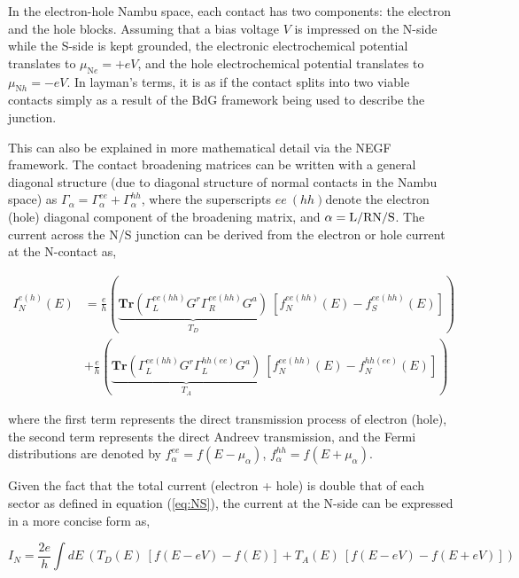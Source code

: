 In the electron-hole Nambu space, each contact has two components: the electron and the hole blocks. Assuming that a bias voltage $V$ is impressed on the N-side while the S-side is kept grounded, the electronic electrochemical potential translates to $\mu_{\text{N}e} = +eV$, and the hole electrochemical potential translates to $\mu_{\text{N}h} = -eV$. In layman's terms, it is as if the contact splits into two viable contacts simply as a result of the BdG framework being used to describe the junction. \par 

This can also be explained in more mathematical detail via the NEGF framework. The contact broadening matrices can be written with a general diagonal structure (due to diagonal structure of normal contacts in the Nambu space) as $\Gamma_{\alpha} = \Gamma_{\alpha}^{ee} + \Gamma_{\alpha}^{hh}$, where the superscripts $ee \: (hh)$denote the electron (hole) diagonal component of the broadening matrix, and $\alpha = \text{L/R}\/\text{N/S}$. The current across the N/S junction can be derived from the electron or hole current at the N-contact as,

\begin{equation} \label{eq:NS}
   \begin{aligned}
       I^{e(h)}_{N}(E) &= \frac{e}{h}\left(\underbrace{\textbf{Tr}(\Gamma_{L}^{ee(hh)}G^{r}\Gamma_{R}^{ee(hh)}G^{a})}_{T_{D}}\:[f_{N}^{ee(hh)}(E)-f_{S}^{ee(hh)}(E)]\right)  \\
       &+ \frac{e}{h}\left(\underbrace{\textbf{Tr}(\Gamma_{L}^{ee(hh)}G^{r}\Gamma_{L}^{hh(ee)}G^{a})}_{T_{A}}\:[f_{N}^{ee(hh)}(E)-f_{N}^{hh(ee)}(E)]\right)         
   \end{aligned}       
\end{equation}  

where the first term represents the direct transmission process of electron (hole), the second term represents the direct Andreev transmission, and the Fermi distributions are denoted by $f^{ee}_{\alpha}=f(E-\mu_{\alpha})$, $f^{hh}_{\alpha}=f(E+\mu_{\alpha})$. \par 

Given the fact that the total current (electron + hole) is double that of each sector as defined in equation (\ref{eq:NS}), the current at the N-side can be expressed in a more concise form as,

\begin{equation}
    I_{N} = \frac{2e}{h}\int dE\:(T_{D}(E)\:[f(E-eV)-f(E)]+T_{A}(E)\:[f(E-eV)-f(E+eV)])    
\end{equation}

